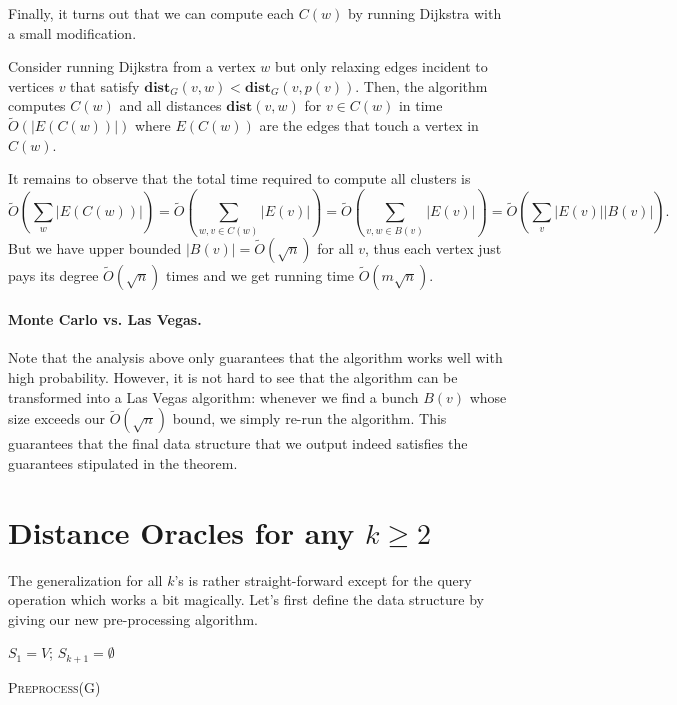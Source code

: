 Finally, it turns out that we can compute each $C(w)$ by running Dijkstra with a small modification.

\begin{lemma}
Consider running Dijkstra from a vertex $w$ but only relaxing edges incident to vertices $v$ that satisfy $\mathbf{dist}_G(v,w) < \mathbf{dist}_G(v,p(v))$. Then, the algorithm computes $C(w)$ and all distances $\mathbf{dist}(v,w)$ for $v \in C(w)$ in time $\tilde{O}(|E(C(w))|)$ where $E(C(w))$ are the edges that touch a vertex in $C(w)$. 
\end{lemma}
 
It remains to observe that the total time required to compute all clusters is
\[
    \tilde{O}(\sum_{w} |E(C(w))|) = \tilde{O}(\sum_{w, v \in C(w)} |E(v)|) = \tilde{O}(\sum_{v, w \in B(v)} |E(v)|) = \tilde{O}(\sum_{v} |E(v)| |B(v)|).
\]
But we have upper bounded $|B(v)| = \tilde{O}(\sqrt{n})$ for all $v$, thus each vertex just pays its degree $\tilde{O}(\sqrt{n})$ times and we get running time $\tilde{O}(m\sqrt{n})$.

\paragraph{Monte Carlo vs. Las Vegas.} Note that the analysis above only guarantees that the algorithm works well with high probability. However, it is not hard to see that the algorithm can be transformed into a Las Vegas algorithm: whenever we find a bunch $B(v)$ whose size exceeds our $\tilde{O}(\sqrt{n})$ bound, we simply re-run the algorithm. This guarantees that the final data structure that we output indeed satisfies the guarantees stipulated in the theorem.

\section{Distance Oracles for any $k \geq 2$}

The generalization for all $k$'s is rather straight-forward except for the query operation which works a bit magically. Let's first define the data structure by giving our new pre-processing algorithm.

\begin{algorithm}
  \SetAlgoLined
  $S_1 = V$; $S_{k+1} = \emptyset$\;
  
  \caption{\textsc{Preprocess}(G)}
\end{algorithm}

